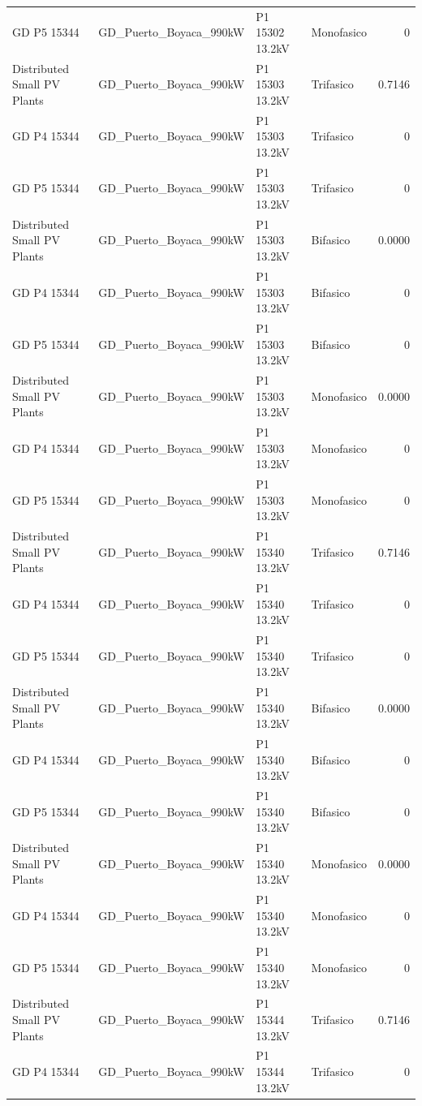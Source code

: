 \documentclass[11pt,a4paper]{article}
\begin{document}
\begin{longtable}{llllr}
GD P5 15344 & GD\_Puerto\_Boyaca\_990kW & P1 15302 13.2kV & Monofasico & 0 \\
Distributed Small PV Plants & GD\_Puerto\_Boyaca\_990kW & P1 15303 13.2kV & Trifasico & 0.7146 \\
GD P4 15344 & GD\_Puerto\_Boyaca\_990kW & P1 15303 13.2kV & Trifasico & 0 \\
GD P5 15344 & GD\_Puerto\_Boyaca\_990kW & P1 15303 13.2kV & Trifasico & 0 \\
Distributed Small PV Plants & GD\_Puerto\_Boyaca\_990kW & P1 15303 13.2kV & Bifasico & 0.0000 \\
GD P4 15344 & GD\_Puerto\_Boyaca\_990kW & P1 15303 13.2kV & Bifasico & 0 \\
GD P5 15344 & GD\_Puerto\_Boyaca\_990kW & P1 15303 13.2kV & Bifasico & 0 \\
Distributed Small PV Plants & GD\_Puerto\_Boyaca\_990kW & P1 15303 13.2kV & Monofasico & 0.0000 \\
GD P4 15344 & GD\_Puerto\_Boyaca\_990kW & P1 15303 13.2kV & Monofasico & 0 \\
GD P5 15344 & GD\_Puerto\_Boyaca\_990kW & P1 15303 13.2kV & Monofasico & 0 \\
Distributed Small PV Plants & GD\_Puerto\_Boyaca\_990kW & P1 15340 13.2kV & Trifasico & 0.7146 \\
GD P4 15344 & GD\_Puerto\_Boyaca\_990kW & P1 15340 13.2kV & Trifasico & 0 \\
GD P5 15344 & GD\_Puerto\_Boyaca\_990kW & P1 15340 13.2kV & Trifasico & 0 \\
Distributed Small PV Plants & GD\_Puerto\_Boyaca\_990kW & P1 15340 13.2kV & Bifasico & 0.0000 \\
GD P4 15344 & GD\_Puerto\_Boyaca\_990kW & P1 15340 13.2kV & Bifasico & 0 \\
GD P5 15344 & GD\_Puerto\_Boyaca\_990kW & P1 15340 13.2kV & Bifasico & 0 \\
Distributed Small PV Plants & GD\_Puerto\_Boyaca\_990kW & P1 15340 13.2kV & Monofasico & 0.0000 \\
GD P4 15344 & GD\_Puerto\_Boyaca\_990kW & P1 15340 13.2kV & Monofasico & 0 \\
GD P5 15344 & GD\_Puerto\_Boyaca\_990kW & P1 15340 13.2kV & Monofasico & 0 \\
Distributed Small PV Plants & GD\_Puerto\_Boyaca\_990kW & P1 15344 13.2kV & Trifasico & 0.7146 \\
GD P4 15344 & GD\_Puerto\_Boyaca\_990kW & P1 15344 13.2kV & Trifasico & 0 \\

\end{longtable}
\end{document}
